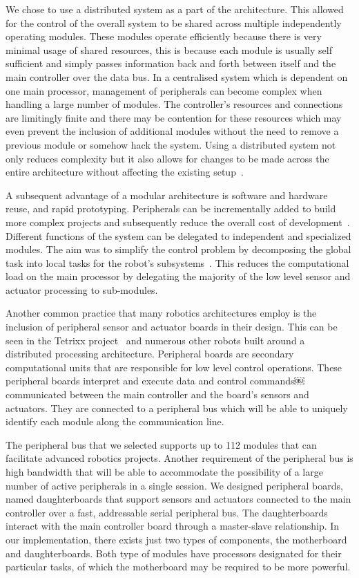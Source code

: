 We chose to use a distributed system as a part of the architecture. This allowed for the control of the overall system to be shared across multiple independently operating modules. These modules operate efficiently because there is very minimal usage of shared resources, this is because each module is usually self sufficient and simply passes information back and forth between itself and the main controller over the data bus. In a centralised system which is dependent on one main processor, management of peripherals can become complex when handling a large number of modules. The controller's resources and connections are limitingly finite and there may be contention for these resources which may even prevent the inclusion of additional modules without the need to remove a previous module or somehow hack the system.  Using a distributed system not only reduces complexity but it also allows for changes to be made across the entire architecture without affecting the existing setup~\parencite{avcithesis}.

A subsequent advantage of a modular architecture is software and hardware reuse, and rapid prototyping. Peripherals can be incrementally added to build more complex projects and subsequently reduce the overall cost of development~\parencite{modcom}. Different functions of the system can be delegated to independent and specialized modules. The aim was to simplify the control problem by decomposing the global task into local tasks for the robot's subsystems~\parencite{rdk}. This reduces the computational load on the main processor by delegating the majority of the low level sensor and actuator processing to sub-modules. 

Another common practice that many robotics architectures employ is the inclusion of peripheral sensor and actuator boards in their design. This can be seen in the Tetrixx project~\parencite{tetrixx} and numerous other robots built around a distributed processing architecture. Peripheral boards are secondary computational units that are responsible for low level control operations. These peripheral boards interpret and execute data and control commands￼communicated between the main controller and the board's sensors and actuators. They are connected to a peripheral bus which will be able to uniquely identify each module along the communication line. 

The peripheral bus that we selected supports up to 112 modules that can facilitate advanced robotics projects. Another requirement of the peripheral bus is high bandwidth that will be able to accommodate the possibility of a large number of active peripherals in a single session. We designed peripheral boards, named daughterboards that support sensors and actuators connected to the main controller over a fast, addressable serial peripheral bus. The daughterboards interact with the main controller board through a master-slave relationship. In our implementation, there exists just two types of components, the motherboard and daughterboards. Both type of modules have processors designated for their particular tasks, of which the motherboard may be required to be more powerful.


